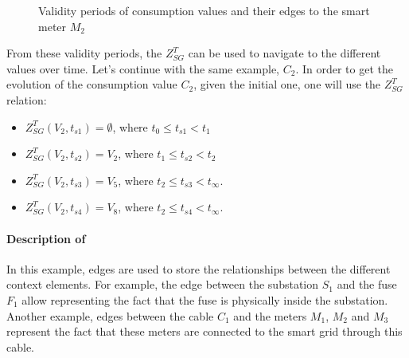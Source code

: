 \begin{figure}
	\centering
	\hfil
	\caption{Validity periods of consumption values and their edges to the smart meter $M_2$}
\end{figure}

From these validity periods, the $Z^T_{SG}$ can be used to navigate to the different values over time.
Let's continue with the same example, $C_2$.
In order to get the evolution of the consumption value $C_2$, given the initial one, one will use the $Z^T_{SG}$ relation:
\begin{itemize}
	\item $Z^T_{SG}(V_2, t_{s1}) = \emptyset$, where $t_0 \leqslant t_{s1} < t_1$
	\item $Z^T_{SG}(V_2, t_{s2}) = V_2$, where $t_1 \leqslant t_{s2} < t_2$
	\item $Z^T_{SG}(V_2, t_{s3}) = V_5$, where $t_2 \leqslant t_{s3} < t_\infty$.
	\item $Z^T_{SG}(V_2, t_{s4}) = V_8$, where $t_2 \leqslant t_{s4} < t_\infty$.
\end{itemize}


\paragraph{Description of }
In this example, edges are used to store the relationships between the different context elements.
For example, the edge between the substation $S_1$ and the fuse $F_1$ allow representing the fact that the fuse is physically inside the substation.
Another example, edges between the cable $C_1$ and the meters $M_1$, $M_2$ and $M_3$ represent the fact that these meters are connected to the smart grid through this cable.

